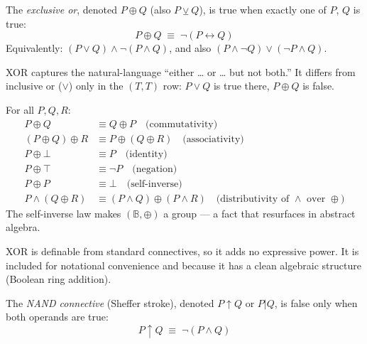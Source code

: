 \vspace{1em}

\begin{tcolorbox}[colback=propbox, colframe=propborder, arc=2pt,
  left=6pt, right=6pt, top=4pt, bottom=4pt,
  title={\small\textbf{Definition (Exclusive Or — XOR)}},
  fonttitle=\small\bfseries]
\label{def:xor}
The \emph{exclusive or}, denoted $P \oplus Q$ (also $P \veebar Q$), is true
when exactly one of $P$, $Q$ is true:
\[
P \oplus Q \;\equiv\; \neg(P \leftrightarrow Q)
\]
Equivalently: $(P \vee Q) \wedge \neg(P \wedge Q)$, and also
$(P \wedge \neg Q) \vee (\neg P \wedge Q)$.
\end{tcolorbox}

\begin{remark}
XOR captures the natural-language ``either … or … but not both.'' It differs
from inclusive or ($\vee$) only in the $(T, T)$ row: $P \vee Q$ is true there,
$P \oplus Q$ is false.
\end{remark}

\begin{remark}
For all $P, Q, R$:
\begin{align*}
P \oplus Q &\equiv Q \oplus P \quad\text{(commutativity)}\\
(P \oplus Q) \oplus R &\equiv P \oplus (Q \oplus R) \quad\text{(associativity)}\\
P \oplus \bot &\equiv P \quad\text{(identity)}\\
P \oplus \top &\equiv \neg P \quad\text{(negation)}\\
P \oplus P &\equiv \bot \quad\text{(self-inverse)}\\
P \wedge (Q \oplus R) &\equiv (P \wedge Q) \oplus (P \wedge R) \quad\text{(distributivity of $\wedge$ over $\oplus$)}
\end{align*}
The self-inverse law makes $(\mathbb{B}, \oplus)$ a group — a fact that
resurfaces in abstract algebra.
\end{remark}

\begin{remark}[Consequence]
XOR is definable from standard connectives, so it adds no expressive power.
It is included for notational convenience and because it has a clean algebraic
structure (Boolean ring addition).
\end{remark}

\begin{tcolorbox}[colback=propbox, colframe=propborder, arc=2pt,
  left=6pt, right=6pt, top=4pt, bottom=4pt,
  title={\small\textbf{Definition (NAND — Sheffer Stroke)}},
  fonttitle=\small\bfseries]
\label{def:nand}
The \emph{NAND connective} (Sheffer stroke), denoted $P \uparrow Q$ or $P | Q$,
is false only when both operands are true:
\[
P \uparrow Q \;\equiv\; \neg(P \wedge Q)
\]
\end{tcolorbox}

